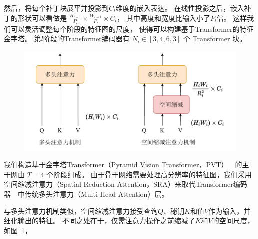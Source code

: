 然后，将每个补丁块展平并投影到$C_{l}$维度的嵌入表达。
在线性投影之后，嵌入补丁的形状可以看做是
$\frac{H_{l-1}}{P_{l}} \times \frac{W_{l-1}}{P_{l}} \times C_{l} $，
其中高度和宽度比输入小了$P_{l}$倍。
这样我们可以灵活调整每个阶段的特征图的尺度，
使得可以构建基于Transformer的特征金字塔。
%
%
%
%
第$l$阶段的Transformer编码器有 $ N_{i} \in [3,4,6,3] $ 个 Transformer 块。
%
%
%
%
%
\begin{figure}[!ht]
	\centering
	\includegraphics[width=0.95\linewidth]{figures/chapter3/sra}
	\label{cpt3_fig1:sra}
\end{figure}
%
%
%
%
%
\par
%
%
我们构造基于金字塔Transformer（Pyramid Vision Transformer，PVT）~\cite{wang2022pvt}~的主干网由 $T = 4$ 个阶段组成。 
%
%
由于骨干网络需要处理高分辨率的特征图，我们采用空间缩减注意力（Spatial-Reduction Attention，SRA）来取代Transformer编码器~\cite{vaswani2017attention}~中传统多头注意力（Multi-Head Attention）层。
%
%
%
\par 
%
%
与多头注意力机制类似，空间缩减注意力接受查询$Q$、秘钥$K$和值$V$作为输入，并细化输出的特征。
不同之处在于，仅需注意力操作之前缩减了$K$和$V$的空间尺度，如图~\ref{cpt3_fig1:sra}，

